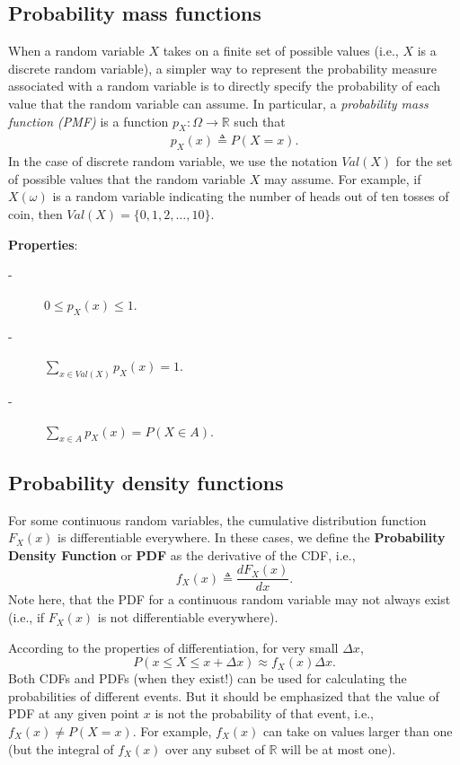 \documentclass{article}
\begin{document}
\subsection{Probability mass functions}

When a random variable $X$ takes on a finite set of possible values (i.e., $X$ is a discrete random variable), a simpler way to represent the probability measure associated with
a random variable is to directly specify the probability of each value that the random variable can assume.  In particular, a \emph{probability
mass function (PMF)} is a function $p_X : \Omega \rightarrow \mathbb{R}$ such that
\begin{align*}
p_X(x)\triangleq P(X=x).
\end{align*}
In the case of discrete random variable, we use the notation $Val(X)$ for the set of possible values that the random variable $X$ may assume.  For example, if $X(\omega)$ is a random
variable indicating the number of heads out of ten tosses of coin, then $Val(X) = \{0,1,2,\ldots,10\}$.  

\textbf{Properties}:
\begin{description}
\item [-] $0 \leq p_X(x) \leq  1$.
\item [-] $\sum_{x \in Val(X)} p_X(x)=1$.
\item [-] $\sum_{x \in A} p_X(x) = P(X \in A)$.
\end{description}

\subsection{Probability density functions}

For some continuous random variables, the cumulative distribution function $F_X(x)$ is differentiable everywhere.  In these cases, we define the \textbf{Probability Density Function} or \textbf{PDF} 
as the derivative of the CDF, i.e.,
\begin{equation}
f_X(x)\triangleq \frac{dF_X(x)}{dx}.
\end{equation}
Note here, that the PDF for a continuous random variable may not always exist (i.e., if $F_X(x)$ is not differentiable everywhere).

According to the properties of differentiation, for very small $\Delta x$,
\begin{equation}
P(x \leq X \leq x+ \Delta x) \approx f_X(x)\Delta x.
\end{equation}
Both CDFs and PDFs (when they exist!) can be used for
calculating the probabilities of different events. But it should be
emphasized that the value of PDF at any given point $x$ is not the probability of
that event, i.e., $f_X(x) \neq P(X = x)$.  For example, $f_X(x)$ can take on
values larger than one (but the integral of $f_X(x)$ over any subset of $\mathbb{R}$ will
be at most one).
\end{document}
